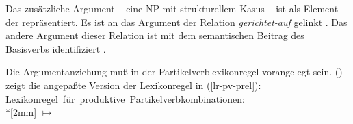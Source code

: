\noindent
Das zusätzliche Argument -- eine NP mit strukturellem Kasus -- ist als Element der \subjl repräsentiert.
Es ist an das Argument der Relation \emph{gerichtet-auf} gelinkt . Das andere Argument dieser
Relation ist mit dem semantischen Beitrag des Basisverbs identifiziert .

Die Argumentanziehung muß in der Partikelverblexikonregel vorangelegt sein.
() zeigt die angepaßte Version der Lexikonregel in (\ref{lr-pv-prel}):
\eas
\label{lr-pv}%
\mbox{Lexikonregel für produktive Partikelverbkombinationen:}\\*[2mm]
\onems[stem]{
           synsem \ibox{1} \onems{ loc$|$cat \ms{ head & \type{verb} \\ 
                                                  subcat & \ibox{2}\\
}
                                 } \\
         }  $\mapsto$ \\
%
%
\zs
{} 

